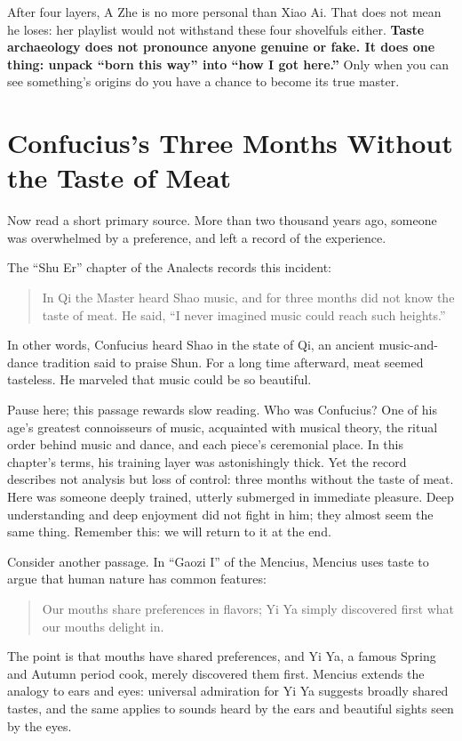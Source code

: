 After four layers, A Zhe is no more personal than Xiao Ai. That does not mean he loses: her playlist would not withstand these four shovelfuls either. \textbf{Taste archaeology does not pronounce anyone genuine or fake. It does one thing: unpack ``born this way'' into ``how I got here.''} Only when you can see something's origins do you have a chance to become its true master.

\section[Confucius and the Taste of Music]{Confucius's Three Months Without the Taste of Meat}
Now read a short primary source. More than two thousand years ago, someone was overwhelmed by a preference, and left a record of the experience.

The ``Shu Er'' chapter of the Analects records this incident:

\begin{quote}
In Qi the Master heard Shao music, and for three months did not know the taste of meat. He said, ``I never imagined music could reach such heights.''
\end{quote}
In other words, Confucius heard Shao in the state of Qi, an ancient music-and-dance tradition said to praise Shun. For a long time afterward, meat seemed tasteless. He marveled that music could be so beautiful.

Pause here; this passage rewards slow reading. Who was Confucius? One of his age's greatest connoisseurs of music, acquainted with musical theory, the ritual order behind music and dance, and each piece's ceremonial place. In this chapter's terms, his training layer was astonishingly thick. Yet the record describes not analysis but loss of control: three months without the taste of meat. Here was someone deeply trained, utterly submerged in immediate pleasure. Deep understanding and deep enjoyment did not fight in him; they almost seem the same thing. Remember this: we will return to it at the end.

Consider another passage. In ``Gaozi I'' of the Mencius, Mencius uses taste to argue that human nature has common features:

\begin{quote}
Our mouths share preferences in flavors; Yi Ya simply discovered first what our mouths delight in.
\end{quote}
The point is that mouths have shared preferences, and Yi Ya, a famous Spring and Autumn period cook, merely discovered them first. Mencius extends the analogy to ears and eyes: universal admiration for Yi Ya suggests broadly shared tastes, and the same applies to sounds heard by the ears and beautiful sights seen by the eyes.

